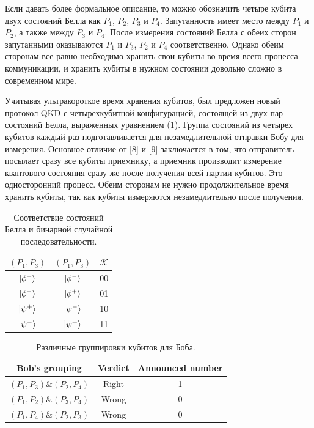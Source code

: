 \documentclass[a4paper,11pt]{article}
\begin{document}
Если давать более формальное описание, то можно обозначить четыре кубита двух состояний Белла как $P_1$, $P_2$, $P_3$ и $P_4$. Запутанность имеет место между $P_1$ и $P_2$, а также между $P_3$ и $P_4$. После измерения состояний Белла с обеих сторон запутанными оказываются $P_1$ и $P_3$, $P_2$ и $P_4$ соответственно. Однако обеим сторонам все равно необходимо хранить свои кубиты во время всего процесса коммуникации, и хранить кубиты в нужном состоянии довольно сложно в современном мире.


Учитывая ультракороткое время хранения кубитов, был предложен новый протокол QKD с четырехкубитной конфигурацией, состоящей из двух пар состояний Белла, выраженных уравнением (1). Группа состояний из четырех кубитов каждый раз подготавливается для незамедлительной отправки Бобу для измерения. Основное отличие от [8] и [9] заключается в том, что отправитель посылает сразу все кубиты приемнику, а приемник производит измерение квантового состояния сразу же после получения всей партии кубитов. Это односторонний процесс. Обеим сторонам не нужно продолжительное время хранить кубиты, так как кубиты измеряются незамедлительно после получения.

\begin{table}
	\centering
	\caption{\label{tab:1}Соответствие состояний Белла и бинарной случайной последовательности.}
	\begin{tabular}{ |c||c||c| }
		\hline
		$(P_1, P_3)$ & $(P_1, P_3)$ & $\mathcal{K}$ \\ \hline
		$\ket{\phi^+}$ & $\ket{\phi^-}$ & 00 \\ 
		$\ket{\phi^-}$ & $\ket{\phi^+}$ & 01 \\ 
		$\ket{\psi^+}$ & $\ket{\psi^-}$ & 10 \\ 
		$\ket{\psi^-}$ & $\ket{\psi^+}$ & 11 \\ 
		\hline
	\end{tabular}
\end{table}

\begin{table}
	\centering
	\caption{\label{tab:2}Различные группировки кубитов для Боба.}
	\begin{tabular}{ |c||c||c| }
		\hline
		Bob's grouping & Verdict & Announced number \\ \hline
		$(P_1, P_3)\&(P_2, P_4)$ & Right & 1 \\
		$(P_1, P_2)\&(P_3, P_4)$ & Wrong & 0 \\
		$(P_1, P_4)\&(P_2, P_3)$ & Wrong & 0 \\
		\hline
	\end{tabular}
	
\end{table}
\end{document}
